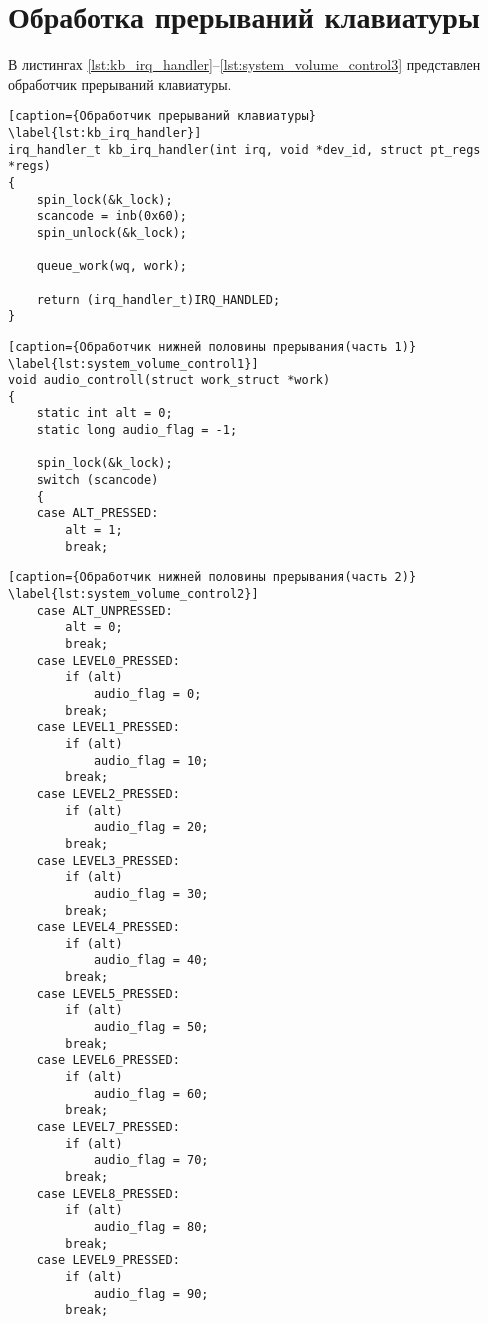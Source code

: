 \section{Обработка прерываний клавиатуры}
В листингах \ref{lst:kb_irq_handler}--\ref{lst:system_volume_control3} представлен обработчик прерываний клавиатуры.

\begin{lstlisting}[caption={Обработчик прерываний клавиатуры} \label{lst:kb_irq_handler}]
irq_handler_t kb_irq_handler(int irq, void *dev_id, struct pt_regs *regs)
{
    spin_lock(&k_lock);
    scancode = inb(0x60);
    spin_unlock(&k_lock);

    queue_work(wq, work);

    return (irq_handler_t)IRQ_HANDLED;
}
\end{lstlisting}

\begin{lstlisting}[caption={Обработчик нижней половины прерывания(часть 1)} \label{lst:system_volume_control1}]
void audio_controll(struct work_struct *work)
{
    static int alt = 0;
    static long audio_flag = -1;

    spin_lock(&k_lock);
    switch (scancode)
    {
    case ALT_PRESSED:
        alt = 1;
        break;
\end{lstlisting}

\clearpage

\begin{lstlisting}[caption={Обработчик нижней половины прерывания(часть 2)} \label{lst:system_volume_control2}]
    case ALT_UNPRESSED:
        alt = 0;
        break;
    case LEVEL0_PRESSED:
        if (alt)
            audio_flag = 0;
        break;
    case LEVEL1_PRESSED:
        if (alt)
            audio_flag = 10;
        break;
    case LEVEL2_PRESSED:
        if (alt)
            audio_flag = 20;
        break;
    case LEVEL3_PRESSED:
        if (alt)
            audio_flag = 30;
        break;
    case LEVEL4_PRESSED:
        if (alt)
            audio_flag = 40;
        break;
    case LEVEL5_PRESSED:
        if (alt)
            audio_flag = 50;
        break;
    case LEVEL6_PRESSED:
        if (alt)
            audio_flag = 60;
        break;
    case LEVEL7_PRESSED:
        if (alt)
            audio_flag = 70;
        break;
    case LEVEL8_PRESSED:
        if (alt)
            audio_flag = 80;
        break;
    case LEVEL9_PRESSED:
        if (alt)
            audio_flag = 90;
        break;
\end{lstlisting}

